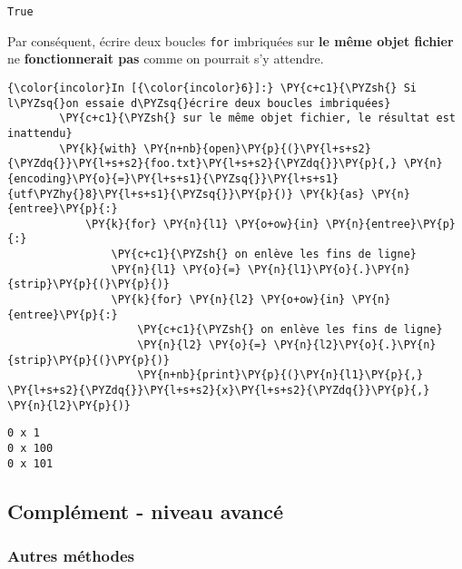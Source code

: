     \begin{Verbatim}[commandchars=\\\{\}]
True

    \end{Verbatim}

    Par conséquent, écrire deux boucles \texttt{for} imbriquées sur
\textbf{le même objet fichier} ne \textbf{fonctionnerait pas} comme on
pourrait s'y attendre.

    \begin{Verbatim}[commandchars=\\\{\}]
{\color{incolor}In [{\color{incolor}6}]:} \PY{c+c1}{\PYZsh{} Si l\PYZsq{}on essaie d\PYZsq{}écrire deux boucles imbriquées}
        \PY{c+c1}{\PYZsh{} sur le même objet fichier, le résultat est inattendu}
        \PY{k}{with} \PY{n+nb}{open}\PY{p}{(}\PY{l+s+s2}{\PYZdq{}}\PY{l+s+s2}{foo.txt}\PY{l+s+s2}{\PYZdq{}}\PY{p}{,} \PY{n}{encoding}\PY{o}{=}\PY{l+s+s1}{\PYZsq{}}\PY{l+s+s1}{utf\PYZhy{}8}\PY{l+s+s1}{\PYZsq{}}\PY{p}{)} \PY{k}{as} \PY{n}{entree}\PY{p}{:}
            \PY{k}{for} \PY{n}{l1} \PY{o+ow}{in} \PY{n}{entree}\PY{p}{:}
                \PY{c+c1}{\PYZsh{} on enlève les fins de ligne}
                \PY{n}{l1} \PY{o}{=} \PY{n}{l1}\PY{o}{.}\PY{n}{strip}\PY{p}{(}\PY{p}{)}
                \PY{k}{for} \PY{n}{l2} \PY{o+ow}{in} \PY{n}{entree}\PY{p}{:}
                    \PY{c+c1}{\PYZsh{} on enlève les fins de ligne}
                    \PY{n}{l2} \PY{o}{=} \PY{n}{l2}\PY{o}{.}\PY{n}{strip}\PY{p}{(}\PY{p}{)}
                    \PY{n+nb}{print}\PY{p}{(}\PY{n}{l1}\PY{p}{,} \PY{l+s+s2}{\PYZdq{}}\PY{l+s+s2}{x}\PY{l+s+s2}{\PYZdq{}}\PY{p}{,} \PY{n}{l2}\PY{p}{)}
\end{Verbatim}


    \begin{Verbatim}[commandchars=\\\{\}]
0 x 1
0 x 100
0 x 101

    \end{Verbatim}

    \hypertarget{compluxe9ment---niveau-avancuxe9}{%
\subsection{Complément - niveau
avancé}\label{compluxe9ment---niveau-avancuxe9}}

    \hypertarget{autres-muxe9thodes}{%
\subsubsection{Autres méthodes}\label{autres-muxe9thodes}}

